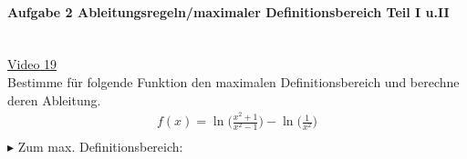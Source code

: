 \paragraph{Aufgabe 2 Ableitungsregeln/maximaler Definitionsbereich Teil I u.II}$  $\vspace*{3mm}\\
\href{https://youtu.be/_vTSb95KkUg}{Video 19}\\
Bestimme für folgende Funktion den maximalen Definitionsbereich und berechne deren Ableitung.\\
\begin{align*}
f(x)=\ln\bigg(\frac{x^2+1}{x^2-1}\bigg)-\ln\bigg(\frac{1}{x^2}\bigg)\\
\end{align*}
$ \blacktriangleright $ Zum max. Definitionsbereich:\\
